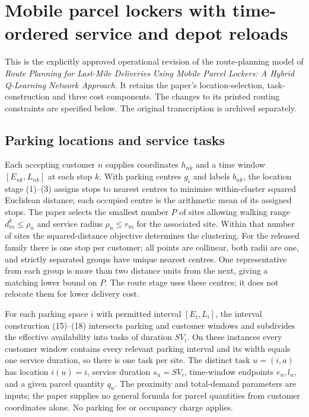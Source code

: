 \documentclass[11pt]{article}
\begin{document}
\section*{Mobile parcel lockers with time-ordered service and depot reloads}
This is the explicitly approved operational revision of the route-planning model
of \emph{Route Planning for Last-Mile Deliveries Using Mobile Parcel Lockers:
A Hybrid Q-Learning Network Approach}. It retains the paper's location-selection,
task-construction and three cost components. The changes to its printed routing
constraints are specified below. The original transcription is archived separately.

\subsection*{Parking locations and service tasks}
Each accepting customer $n$ supplies coordinates $h_{nk}$ and a time window
$[E_{nk},L_{nk}]$ at each stop $k$. With parking centres $g_i$ and labels
$b_{nk}$, the location stage (1)--(3) assigns stops to nearest centres to
minimise within-cluster squared Euclidean distance; each occupied centre is
the arithmetic mean of its assigned stops. The paper selects the smallest
number $P$ of sites allowing walking range $d_{in}^k\le\rho_n$ and service
radius $\rho_n\le r_m$ for the associated site. Within that number of
sites the squared-distance objective determines the clustering.
For the released family there is one stop per customer; all points are
collinear, both radii are one, and strictly separated groups have unique
nearest centres. One representative from each group is more than two
distance units from the next, giving a matching lower bound on $P$.
The route stage uses these centres; it does not relocate them for lower
delivery cost.

For each parking space $i$ with permitted interval $[E_i,L_i]$,
the interval construction (15)--(18) intersects parking and customer
windows and subdivides the effective availability into tasks of duration
$SV_i$. On these instances every customer window contains every relevant
parking interval and its width equals one service duration, so there is
one task per site. The distinct task $u=(i,a)$ has location $i(u)=i$,
service duration $s_u=SV_i$, time-window endpoints $e_u,l_u$, and a
given parcel quantity $q_u$. The proximity and total-demand parameters
are inputs; the paper supplies no general formula for parcel quantities
from customer coordinates alone. No parking fee or occupancy charge applies.
\end{document}
